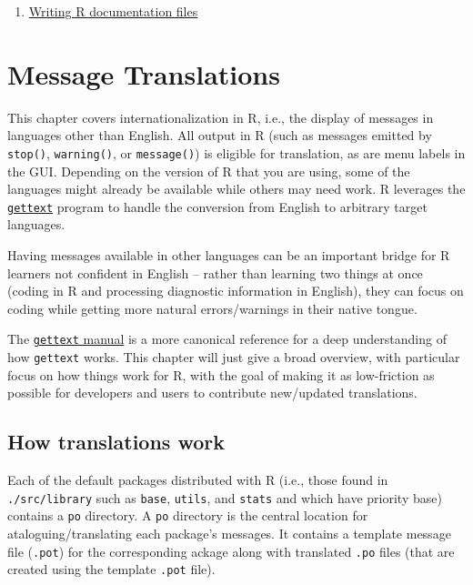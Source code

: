 \documentclass[
]{book}
\providecommand{\tightlist}{%
  \setlength{\itemsep}{0pt}\setlength{\parskip}{0pt}}
\begin{document}
\begin{enumerate}
\def\labelenumi{\arabic{enumi}.}
\tightlist
\item
  \href{https://cran.r-project.org/doc/manuals/r-release/R-exts.html\#Writing-R-documentation-files}{Writing R documentation files}
\end{enumerate}

\hypertarget{message-translations}{%
\chapter{Message Translations}\label{message-translations}}

This chapter covers internationalization in R, i.e., the display of messages in languages other than English. All
output in R (such as messages emitted by \texttt{stop()}, \texttt{warning()}, or \texttt{message()}) is eligible for translation, as
are menu labels in the GUI. Depending on the version of R that you are using, some of the languages might already
be available while others may need work. R leverages the \href{https://www.gnu.org/software/gettext/}{\texttt{gettext}} program
to handle the conversion from English to arbitrary target languages.

Having messages available in other languages can be an important bridge for R learners not confident in English --
rather than learning two things at once (coding in R and processing diagnostic information in English), they can
focus on coding while getting more natural errors/warnings in their native tongue.

The \href{https://www.gnu.org/software/gettext/manual/index.html}{\texttt{gettext} manual} is a more canonical reference for a
deep understanding of how \texttt{gettext} works. This chapter will just give a broad overview, with particular focus on
how things work for R, with the goal of making it as low-friction as possible for developers and users to contribute
new/updated translations.

\hypertarget{how-translations-work}{%
\section{How translations work}\label{how-translations-work}}

Each of the default packages distributed with R (i.e., those found in \texttt{./src/library} such as \texttt{base}, \texttt{utils},
and \texttt{stats} and which have priority base) contains a \texttt{po} directory. A \texttt{po} directory is the central location for
ataloguing/translating each package's messages. It contains a template message file (\texttt{.pot}) for the corresponding
ackage along with translated \texttt{.po} files (that are created using the template \texttt{.pot} file).
\end{document}
